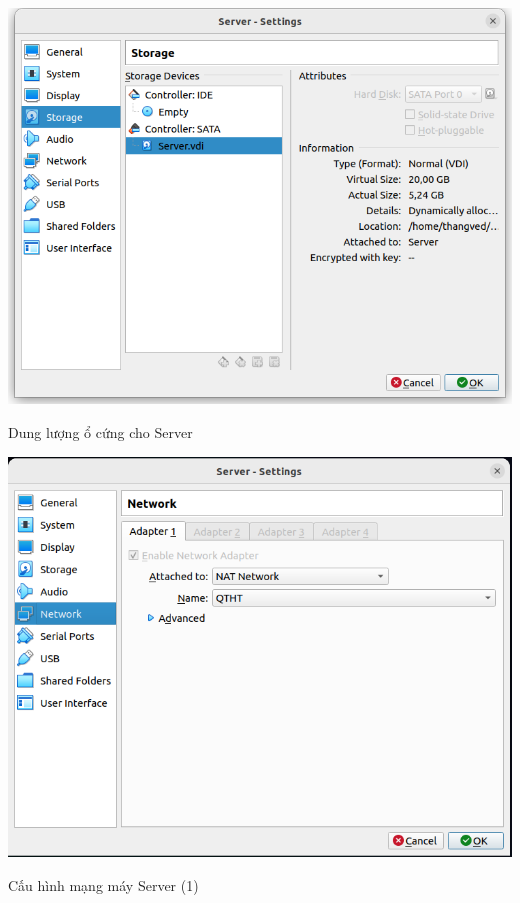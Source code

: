 \documentclass[a4paper, 11pt]{article}
\begin{document}
\begin{itemize}
\begin{enumerate}
                    \begin{minipage}
                        {\linewidth}
                        \captionsetup{type=figure}
                        \centering
                        \includegraphics[width=\linewidth]{images/server-disk.png}
                        \caption{Dung lượng ổ cứng cho Server}
                        \label{figure:server-disk}
                    \end{minipage}

                    \begin{minipage}
                        {\linewidth}
                        \captionsetup{type=figure}
                        \centering
                        \includegraphics[width=\linewidth]{images/server-network-1.png}
                        \caption{Cấu hình mạng máy Server (1)}
                        \label{figure:server-network-1}
                    \end{minipage}


\end{enumerate}
\end{itemize}
\end{document}

